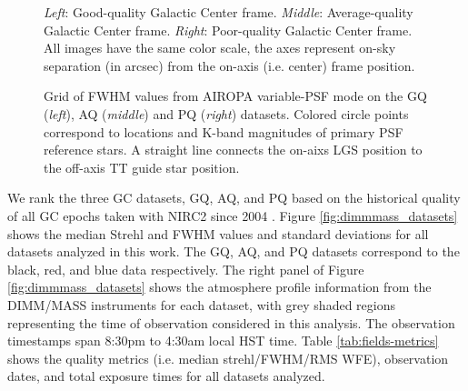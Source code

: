 \documentclass[]{spie}  %
\begin{document}
\begin{figure}[!h]
 \caption{\footnotesize \textit{Left}: Good-quality Galactic Center frame. \textit{Middle}: Average-quality Galactic Center frame. \textit{Right}: Poor-quality Galactic Center frame. All images have the same color scale, the axes represent on-sky separation (in arcsec) from the on-axis (i.e. center) frame position. \label{fig:gc_images}}
\end{figure}

\begin{figure}
 \caption{\footnotesize Grid of FWHM values from AIROPA variable-PSF mode on the GQ (\textit{left}), AQ (\textit{middle}) and PQ (\textit{right}) datasets. Colored circle points correspond to locations and K-band magnitudes of primary PSF reference stars. A straight line connects the on-aixs LGS position to the off-axis TT guide star position. \label{fig:fwhm_grids}}
\end{figure}

\indent We rank the three GC datasets, GQ, AQ, and PQ based on the historical quality of all GC epochs taken with NIRC2 since 2004 \citep{jia:2019a}. Figure \ref{fig:dimmmass_datasets} shows the median Strehl and FWHM values and standard deviations for all datasets analyzed in this work. The GQ, AQ, and PQ datasets correspond to the black, red, and blue data respectively. The right panel of Figure \ref{fig:dimmmass_datasets} shows the atmosphere profile information from the DIMM/MASS instruments for each dataset, with grey shaded regions representing the time of observation considered in this analysis. The observation timestamps span 8:30pm to 4:30am local HST time. Table \ref{tab:fields-metrics} shows the quality metrics (i.e. median strehl/FWHM/RMS WFE), observation dates, and total exposure times for all datasets analyzed.
\end{document}
